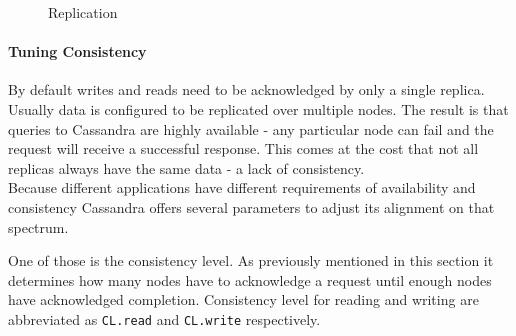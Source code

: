 \begin{figure}[ht]
  \centering
  \caption{Replication}
  \label{fig:cassandra:replication}
\end{figure}

\paragraph{Tuning Consistency} By default writes and reads need to be acknowledged by only a single replica. Usually data is configured to be replicated over multiple nodes. The result is that queries to Cassandra are highly available - any particular node can fail and the request will receive a successful response. This comes at the cost that not all replicas always have the same data - a lack of consistency. \\
Because different applications have different requirements of availability and consistency Cassandra offers several parameters to adjust its alignment on that spectrum.

One of those is the consistency level. As previously mentioned in this section it determines how many nodes have to acknowledge a request until enough nodes have acknowledged completion. Consistency level for reading and writing are abbreviated as \texttt{CL.read} and \texttt{CL.write} respectively.

